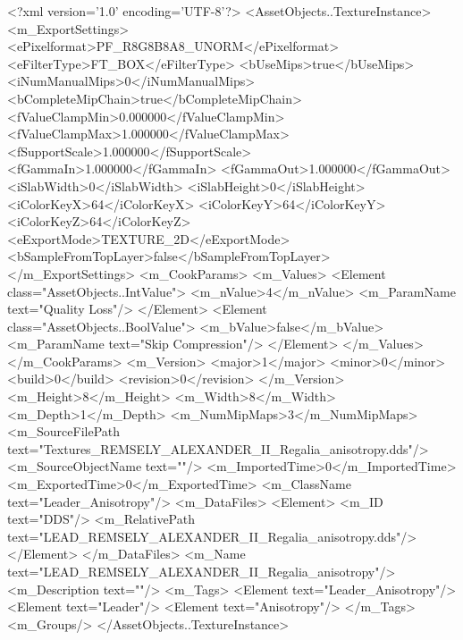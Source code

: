 <?xml version='1.0' encoding='UTF-8'?>
<AssetObjects..TextureInstance>
  <m_ExportSettings>
    <ePixelformat>PF_R8G8B8A8_UNORM</ePixelformat>
    <eFilterType>FT_BOX</eFilterType>
    <bUseMips>true</bUseMips>
    <iNumManualMips>0</iNumManualMips>
    <bCompleteMipChain>true</bCompleteMipChain>
    <fValueClampMin>0.000000</fValueClampMin>
    <fValueClampMax>1.000000</fValueClampMax>
    <fSupportScale>1.000000</fSupportScale>
    <fGammaIn>1.000000</fGammaIn>
    <fGammaOut>1.000000</fGammaOut>
    <iSlabWidth>0</iSlabWidth>
    <iSlabHeight>0</iSlabHeight>
    <iColorKeyX>64</iColorKeyX>
    <iColorKeyY>64</iColorKeyY>
    <iColorKeyZ>64</iColorKeyZ>
    <eExportMode>TEXTURE_2D</eExportMode>
    <bSampleFromTopLayer>false</bSampleFromTopLayer>
  </m_ExportSettings>
  <m_CookParams>
    <m_Values>
      <Element class="AssetObjects..IntValue">
        <m_nValue>4</m_nValue>
        <m_ParamName text="Quality Loss"/>
      </Element>
      <Element class="AssetObjects..BoolValue">
        <m_bValue>false</m_bValue>
        <m_ParamName text="Skip Compression"/>
      </Element>
    </m_Values>
  </m_CookParams>
  <m_Version>
    <major>1</major>
    <minor>0</minor>
    <build>0</build>
    <revision>0</revision>
  </m_Version>
  <m_Height>8</m_Height>
  <m_Width>8</m_Width>
  <m_Depth>1</m_Depth>
  <m_NumMipMaps>3</m_NumMipMaps>
  <m_SourceFilePath text="Textures\LEAD_REMSELY_ALEXANDER_II_Regalia_anisotropy.dds"/>
  <m_SourceObjectName text=""/>
  <m_ImportedTime>0</m_ImportedTime>
  <m_ExportedTime>0</m_ExportedTime>
  <m_ClassName text="Leader_Anisotropy"/>
  <m_DataFiles>
    <Element>
      <m_ID text="DDS"/>
      <m_RelativePath text="LEAD_REMSELY_ALEXANDER_II_Regalia_anisotropy.dds"/>
    </Element>
  </m_DataFiles>
  <m_Name text="LEAD_REMSELY_ALEXANDER_II_Regalia_anisotropy"/>
  <m_Description text=""/>
  <m_Tags>
    <Element text="Leader_Anisotropy"/>
    <Element text="Leader"/>
    <Element text="Anisotropy"/>
  </m_Tags>
  <m_Groups/>
</AssetObjects..TextureInstance>
